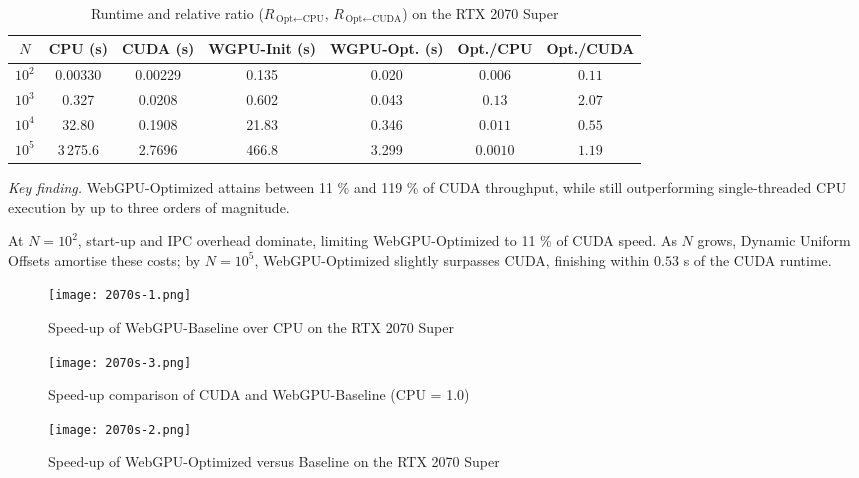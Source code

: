\documentclass[PhD]{PHlab-thesis}
\begin{document}
\begin{table}[h]
  \centering
  \renewcommand{\arraystretch}{1.9}
  \setlength{\tabcolsep}{4pt}
  \small
  \begin{tabular}{|c|c|c|c|c|c|c|}
    \hline
    $N$ & CPU (s) & CUDA (s) & WGPU-Init (s) & WGPU-Opt. (s) & Opt./CPU & Opt./CUDA \\
    \hline
    $10^{2}$ & 0.00330 & 0.00229 & 0.135  & 0.020  & $0.006$ & $0.11$ \\
    $10^{3}$ & 0.327   & 0.0208  & 0.602  & 0.043  & $0.13$  & $2.07$ \\
    $10^{4}$ & 32.80   & 0.1908  & 21.83  & 0.346  & $0.011$ & $0.55$ \\
    $10^{5}$ & 3\,275.6 & 2.7696 & 466.8 & 3.299 & $0.0010$ & $1.19$ \\
    \hline
  \end{tabular}
  \caption{Runtime and relative ratio ($R_{\,\text{Opt}\leftarrow\text{CPU}}$, $R_{\,\text{Opt}\leftarrow\text{CUDA}}$) on the RTX 2070 Super}
  \label{tab:rtx_performance}
\end{table}

\textit{Key finding.} WebGPU-Optimized attains between 11 \% and 119 \% of CUDA throughput, while still outperforming single-threaded CPU execution by up to three orders of magnitude.

At $N=10^{2}$, start-up and IPC overhead dominate, limiting WebGPU-Optimized to 11 \% of CUDA speed. As $N$ grows, Dynamic Uniform Offsets amortise these costs; by $N=10^{5}$, WebGPU-Optimized slightly surpasses CUDA, finishing within $0.53$ s of the CUDA runtime.

\begin{figure}[htbp]
  \centering
  \texttt{[image: 2070s-1.png]}
  \caption{Speed-up of WebGPU-Baseline over CPU on the RTX 2070 Super}
  \label{fig:2070s-wgpu-baseline}
\end{figure}

\begin{figure}[htbp]
  \centering
  \texttt{[image: 2070s-3.png]}
  \caption{Speed-up comparison of CUDA and WebGPU-Baseline (CPU = 1.0)}
  \label{fig:2070s-cuda-vs-baseline}
\end{figure}

\begin{figure}[htbp]
  \centering
  \texttt{[image: 2070s-2.png]}
  \caption{Speed-up of WebGPU-Optimized versus Baseline on the RTX 2070 Super}
  \label{fig:2070s-optimized-vs-baseline}
\end{figure}
\end{document}
